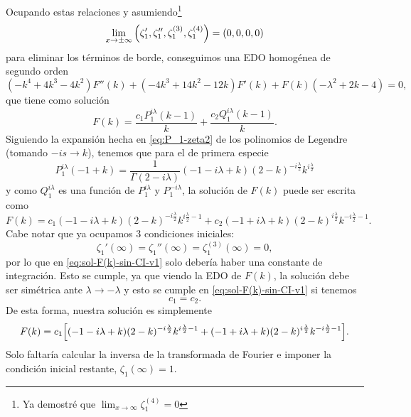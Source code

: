 \documentclass[%
 aip,
 jmp,%
 amsmath,amssymb,
 reprint,%
]{revtex4-2}
\begin{document}
Ocupando estas relaciones y asumiendo\footnote{Ya demostr\'e que $\lim_{x\to\infty}\zeta_1^{(4)}=0$}
\begin{equation}
    \lim_{x\to\pm\infty}\qty(\zeta_1',\zeta_1'',\zeta_1^{(3)},\zeta_1^{(4)}) = (0,0,0,0)
\end{equation}
para eliminar los t\'erminos de borde, conseguimos una EDO homog\'enea de segundo orden
\begin{equation}
    \left(-k^4+4 k^3-4 k^2\right) F''(k)+\left(-4 k^3+14 k^2-12 k\right) F'(k)+F(k) \left(-\lambda ^2+2 k-4\right) = 0,
\end{equation}
que tiene como soluci\'on
\begin{equation}
    F(k) = \frac{c_1 P_1^{i \lambda }(k-1)}{k}+\frac{c_2 Q_1^{i \lambda }(k-1)}{k}.
\end{equation}
Siguiendo la expansi\'on hecha en \eqref{eq:P_1-zeta2} de los polinomios de Legendre (tomando $-is \to k$), tenemos que para el de primera especie
\begin{equation}
    P_1^{i\lambda}(-1 + k) = \frac{1}{\Gamma(2 - i\lambda)}(- 1 - i\lambda + k)(2 - k)^{-i\frac{\lambda}{2}}k^{i\frac{\lambda}{2}}
\end{equation}
y como $Q_1^{i\lambda}$ es una funci\'on de $P_1^{i\lambda}$ y $P_1^{-i\lambda}$, la soluci\'on de $F(k)$ puede ser escrita como
\begin{equation}\label{eq:sol-F(k)-sin-CI-v1}
    F(k) = c_1 (- 1 - i\lambda + k)(2 - k)^{-i\frac{\lambda}{2}}k^{i\frac{\lambda}{2} - 1} + c_2 (- 1 + i\lambda + k)(2 - k)^{i\frac{\lambda}{2}}k^{-i\frac{\lambda}{2} - 1}.
\end{equation}
Cabe notar que ya ocupamos 3 condiciones iniciales:
\begin{equation*}
    \zeta_1'(\infty)=\zeta_1''(\infty)=\zeta_1^{(3)}(\infty)=0,
\end{equation*}
por lo que en \eqref{eq:sol-F(k)-sin-CI-v1} solo deber\'ia haber una constante de integraci\'on. Esto se cumple, ya que viendo la EDO de $F(k)$, la soluci\'on debe ser sim\'etrica ante $\lambda\to-\lambda$ y esto se cumple en \eqref{eq:sol-F(k)-sin-CI-v1} si tenemos 
\begin{equation*}
    c_1 = c_2.
\end{equation*}
De esta forma, nuestra soluci\'on es simplemente
\begin{equation}\label{eq:sol-F(k)-sin-CI}
    F(k) = c_1 \qty[(- 1 - i\lambda + k)(2 - k)^{-i\frac{\lambda}{2}}k^{i\frac{\lambda}{2} - 1} + (- 1 + i\lambda + k)(2 - k)^{i\frac{\lambda}{2}}k^{-i\frac{\lambda}{2} - 1}].
\end{equation}
Solo faltar\'ia calcular la inversa de la transformada de Fourier e imponer la condici\'on inicial restante, $\zeta_1(\infty)=1$.
\end{document}
